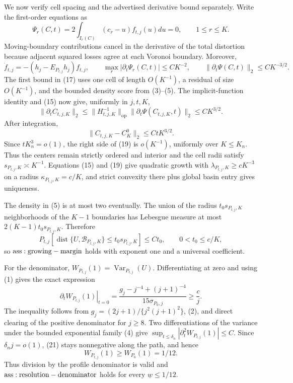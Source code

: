 We now verify cell spacing and the advertised derivative bound separately.  Write the first-order equations as
\[
 \Psi_r(C,t)=2\int_{I_r(C)}(c_r-u)f_{t,j}(u)du=0,\qquad 1\leq r\leq K.                   \tag{16}
\]
Moving-boundary contributions cancel in the derivative of the total distortion because adjacent squared losses agree at each Voronoi boundary.  Moreover,
\[
 \dot f_{t,j}=-(h_j-E_{P_{t,j}}h_j)f_{t,j},\qquad
 \max_r|\partial_t\Psi_r(C,t)|\leq CK^{-2},\qquad
 \|\partial_t\Psi(C,t)\|_2\leq CK^{-3/2}.                                             \tag{17}
\]
The first bound in (17) uses one cell of length \(O(K^{-1})\), a residual of size \(O(K^{-1})\), and the bounded density score from (3)--(5).  The implicit-function identity and (15) now give, uniformly in \(j,t,K\),
\[
 \|\partial_t C_{t,j,K}\|_2
 \leq\|H_{t,j,K}^{-1}\|_{\mathrm{op}}\|\partial_t\Psi(C_{t,j,K},t)\|_2
 \leq CK^{3/2}.                                                                         \tag{18}
\]
After integration,
\[
 \|C_{t,j,K}-C_K^0\|_2\leq CtK^{3/2}.                                                  \tag{19}
\]
Since \(tK_n^3=o(1)\), the right side of (19) is \(o(K^{-1})\), uniformly over \(K\leq K_n\).  Thus the centers remain strictly ordered and interior and the cell radii satisfy \(s_{P_{t,j},K}\asymp K^{-1}\).  Equations (15) and (19) give quadratic growth with \(\lambda_{P_{t,j},K}\geq cK^{-3}\) on a radius \(\kappa_{P_{t,j},K}=c/K\), and strict convexity there plus global basin entry gives uniqueness.

The density in (5) is at most two eventually.  The union of the radius \(t_0s_{P_{t,j},K}\) neighborhoods of the \(K-1\) boundaries has Lebesgue measure at most \(2(K-1)t_0s_{P_{t,j},K}\).  Therefore
\[
 P_{t,j}\!\left[\operatorname{dist}\{U,\mathcal B_{P_{t,j},K}\}
 \leq t_0s_{P_{t,j},K}\right]\leq Ct_0,\qquad 0<t_0\leq c/K,                           \tag{20}
\]
so \({\rm ass:growing-margin}\) holds with exponent one and a universal coefficient.

For the denominator, \(W_{P_{t,j}}(1)=\operatorname{Var}_{P_{t,j}}(U)\).  Differentiating at zero and using (1) gives the exact expression
\[
 \left.\partial_tW_{P_{t,j}}(1)\right|_{t=0}
 =\frac{g_j-j^{-4}+(j+1)^{-4}}{15\sigma_{P_0,j}}\geq\frac{c}{j}.                         \tag{21}
\]
The inequality follows from \(g_j=(2j+1)/\{j^2(j+1)^2\}\), (2), and direct clearing of the positive denominator for \(j\geq8\).  Two differentiations of the variance under the bounded exponential family (4) give \(\sup_{t\leq\delta_n}|\partial_t^2W_{P_{t,j}}(1)|\leq C\).  Since \(\delta_nj=o(1)\), (21) stays nonnegative along the path, and hence
\[
 W_{P_{t,j}}(1)\geq W_{P_0}(1)=1/12.                                                     \tag{22}
\]
Thus division by the profile denominator is valid and \({\rm ass:resolution-denominator}\) holds for every \(\underline w\leq1/12\).

